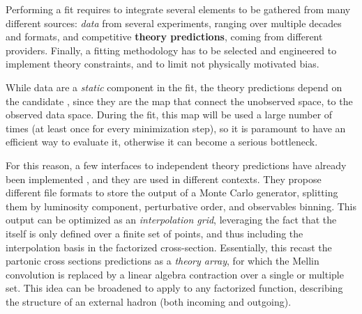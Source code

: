 
Performing a \pdf fit requires to integrate several elements to be gathered
from many different sources: \textit{data} from several experiments, ranging
over multiple decades and formats, and competitive \textbf{theory predictions},
coming from different providers.
Finally, a fitting methodology has to be selected and engineered to implement
theory constraints, and to limit not physically motivated bias.

While data are a \textit{static} component in the fit, the theory predictions
depend on the candidate \pdf, since they are the map that connect the
unobserved \pdf space, to the observed data space.
During the fit, this map will be used a large number of times (at least once
for every minimization step), so it is paramount to have an efficient way to
evaluate it, otherwise it can become a serious bottleneck.

For this reason, a few interfaces to \pdf independent theory predictions have
already been implemented
\cite{Carli:2010rw,Britzger:2012bs,Britzger:2022lbf,Carrazza:2020gss}, and they
are used in different contexts.
They propose different file formats to store the output of a Monte Carlo
generator, splitting them by luminosity component, perturbative order, and
observables binning.
This output can be optimized as an \textit{interpolation grid}, leveraging the
fact that the \pdf itself is only defined over a finite set of points, and thus
including the interpolation basis in the factorized cross-section.
Essentially, this recast the partonic cross sections predictions as
a \textit{theory array}, for which the Mellin convolution is replaced by a
linear algebra contraction over a single or multiple \pdf set.
This idea can be broadened to apply to any factorized function, describing the
structure of an external hadron (both incoming and outgoing).

